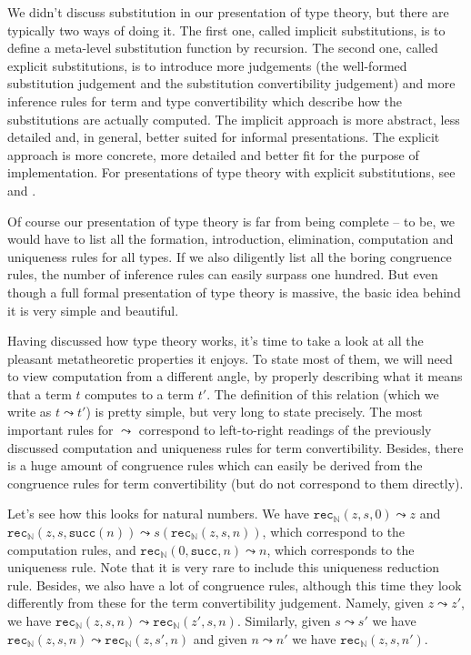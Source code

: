 \documentclass[declaration,mgr,english,shortabstract]{iithesis}
\newcommand{\m}[1]{\texttt{#1}}
\newcommand{\N}{\mathbb{N}}
\newcommand{\suc}[1]{\m{succ}(#1)}
\newcommand{\recN}[3]{\m{rec}_\N(#1, #2, #3)}
\begin{document}
We didn't discuss substitution in our presentation of type theory, but there are typically two ways of doing it. The first one, called implicit substitutions, is to define a meta-level substitution function by recursion. The second one, called explicit substitutions, is to introduce more judgements (the well-formed substitution judgement and the substitution convertibility judgement) and more inference rules for term and type convertibility which describe how the substitutions are actually computed. The implicit approach is more abstract, less detailed and, in general, better suited for informal presentations. The explicit approach is more concrete, more detailed and better fit for the purpose of implementation. For presentations of type theory with explicit substitutions, see \cite{Danielsson} and \cite{EatItself}.

Of course our presentation of type theory is far from being complete -- to be, we would have to list all the formation, introduction, elimination, computation and uniqueness rules for all types. If we also diligently list all the boring congruence rules, the number of inference rules can easily surpass one hundred. But even though a full formal presentation of type theory is massive, the basic idea behind it is very simple and beautiful.

Having discussed how type theory works, it's time to take a look at all the pleasant metatheoretic properties it enjoys. To state most of them, we will need to view computation from a different angle, by properly describing what it means that a term $t$ computes to a term $t'$. The definition of this relation (which we write as $t \leadsto t'$) is pretty simple, but very long to state precisely. The most important rules for $\leadsto$ correspond to left-to-right readings of the previously discussed computation and uniqueness rules for term convertibility. Besides, there is a huge amount of congruence rules which can easily be derived from the congruence rules for term convertibility (but do not correspond to them directly).

Let's see how this looks for natural numbers. We have $\recN{z}{s}{0} \leadsto z$ and $\recN{z}{s}{\suc{n}} \leadsto s(\recN{z}{s}{n})$, which correspond to the computation rules, and $\recN{0}{\m{succ}}{n} \leadsto n$, which corresponds to the uniqueness rule. Note that it is very rare to include this uniqueness reduction rule. Besides, we also have a lot of congruence rules, although this time they look differently from these for the term convertibility judgement. Namely, given $z \leadsto z'$, we have $\recN{z}{s}{n} \leadsto \recN{z'}{s}{n}$. Similarly, given $s \leadsto s'$ we have $\recN{z}{s}{n} \leadsto \recN{z}{s'}{n}$ and given $n \leadsto n'$ we have $\recN{z}{s}{n'}$.
\end{document}
